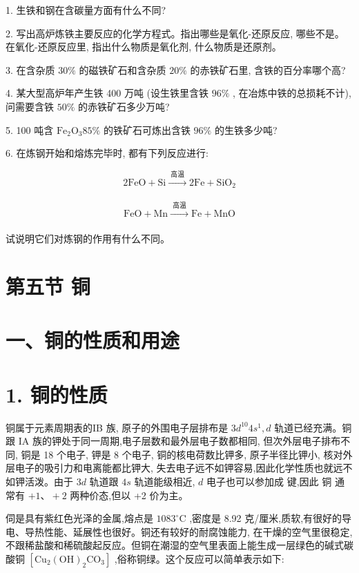 \documentclass[10pt]{article}
\begin{document}
1. 生铁和钢在含碳量方面有什么不同?

2. 写出高炉炼铁主要反应的化学方程式。指出哪些是氧化-还原反应, 哪些不是。在氧化-还原反应里, 指出什么物质是氧化剂, 什么物质是还原剂。

3. 在含杂质 \({30}\%\) 的磁铁矿石和含杂质 \({20}\%\) 的赤铁矿石里, 含铁的百分率哪个高?

4. 某大型高炉年产生铁 400 万吨 (设生铁里含铁 \({96}\%\) , 在冶炼中铁的总损耗不计),问需要含铁 \({50}\%\) 的赤铁矿石多少万吨?

5. 100 吨含 \({\mathrm{{Fe}}}_{2}{\mathrm{O}}_{3}{85}\%\) 的铁矿石可炼出含铁 \({96}\%\) 的生铁多少吨?

6. 在炼钢开始和熔炼完毕时, 都有下列反应进行:

\[
2\mathrm{{FeO}} + \mathrm{{Si}}\xrightarrow[]{\text{ 高温 }}2\mathrm{{Fe}} + {\mathrm{{SiO}}}_{2}
\]

\[
\mathrm{{FeO}} + \mathrm{{Mn}}\xrightarrow[]{\text{ 高温 }}\mathrm{{Fe}} + \mathrm{{MnO}}
\]

试说明它们对炼钢的作用有什么不同。

\section*{第五节 铜}

\section*{一、铜的性质和用途}

\section*{1. 铜的性质}

铜属于元素周期表的IB 族, 原子的外围电子层排布是 \(3{d}^{10}4{s}^{1},d\) 轨道已经充满。铜跟 IA 族的钾处于同一周期,电子层数和最外层电子数都相同, 但次外层电子排布不同, 铜是 18 个电子, 钾是 8 个电子, 铜的核电荷数比钾多, 原子半径比钾小, 核对外层电子的吸引力和电离能都比钾大, 失去电子远不如钾容易,因此化学性质也就远不如钾活泼。由于 \({3d}\) 轨道跟 \({4s}\) 轨道能级相近, \(d\) 电子也可以参加成 键,因此 铜 通常有 \(+ 1\text{、} + 2\) 两种价态,但以 +2 价为主。

伺是具有紫红色光泽的金属,熔点是 \({1083}^{ \circ }\mathrm{C}\) ,密度是 8.92 克/厘米,质软,有很好的导电、导热性能、延展性也很好。铜还有较好的耐腐蚀能力, 在干燥的空气里很稳定, 不跟稀盐酸和稀硫酸起反应。但铜在潮湿的空气里表面上能生成一层绿色的碱式碳酸铜 \(\left\lbrack {{\mathrm{{Cu}}}_{2}{\left( \mathrm{{OH}}\right) }_{2}{\mathrm{{CO}}}_{3}}\right\rbrack\) ,俗称铜绿。这个反应可以简单表示如下:
\end{document}

